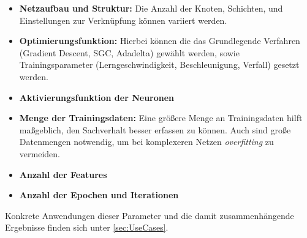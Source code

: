 \begin{itemize}
	\item \textbf{Netzaufbau und Struktur:} Die Anzahl der Knoten, Schichten, und Einstellungen zur Verknüpfung können variiert werden.
	\item \textbf{Optimierungsfunktion:} Hierbei können die das Grundlegende Verfahren (Gradient Descent, SGC, Adadelta) gewählt werden, sowie Trainingsparameter (Lerngeschwindigkeit, Beschleunigung, Verfall) gesetzt werden.
	\item \textbf{Aktivierungsfunktion der Neuronen}
	\item \textbf{Menge der Trainingsdaten:} Eine größere Menge an Trainingsdaten hilft maßgeblich, den Sachverhalt besser erfassen zu können. Auch sind große Datenmengen notwendig, um bei komplexeren Netzen \textit{overfitting} zu vermeiden.
	\item \textbf{Anzahl der Features} 
	\item \textbf{Anzahl der Epochen und Iterationen}
	
\end{itemize}

Konkrete Anwendungen dieser Parameter und die damit zusammenhängende Ergebnisse finden sich unter \ref{sec:UseCases}.